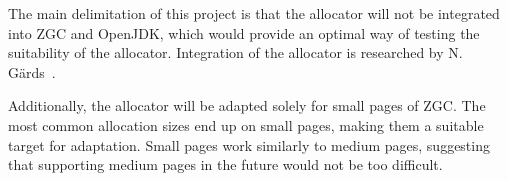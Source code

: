 
The main delimitation of this project is that the allocator will not be integrated into ZGC and OpenJDK, which would provide an optimal way of testing the suitability of the allocator. Integration of the allocator is researched by N. Gärds~\cite{niclas}.

Additionally, the allocator will be adapted solely for small pages of ZGC. The most common allocation sizes end up on small pages, making them a suitable target for adaptation. Small pages work similarly to medium pages, suggesting that supporting medium pages in the future would not be too difficult. 

